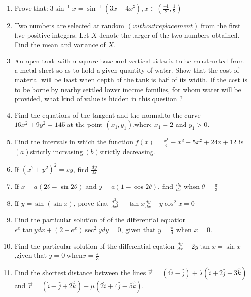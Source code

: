 \documentclass[10pt,-letter paper]{article}
\providecommand{\brak}[1]{\ensuremath{\left(#1\right)}}
\begin{document}
\begin{enumerate}
\item Prove that:
$3\sin^{-1}x=\sin^{-1}\brak{3x-4x^3}, x\in\brak{\frac{-1}{2},\frac{1}{2}}$

\item Two numbers are selected at random \brak{without replacement} from the first five positive integers. Let $X$ denote the larger of the two numbers obtained. Find the mean and variance of $X$.

\item An open tank with a square base and vertical sides is to be constructed from a metal sheet so as to hold a given quantity of water. Show that the cost of material will be least when depth of the tank is half of its width. If the cost is to be borne by nearby settled lower income families, for whom water will be provided, what kind of value is hidden in this question ?

\item Find the equations of the tangent and the normal,to the curve $16x^{2}+9y^{2}=145$ at the point $\brak{x_1,y_1}$,where $x_1=2$ and $y_1>0$.

\item Find the intervals in which the function $f\brak{x}=\frac{x^4}{4}-x^{3}-5x^{2}+24x+12 $ is $(a)$strictly increasing,$(b)$strictly decreasing.

\item If ${\brak{x^{2}+y^{2}}}^{2}=xy$, find $\frac{dy}{dx}$

\item If $x=a\brak{2\theta-\sin 2\theta}$ and $y=a\brak{1-\cos 2\theta}$, find $\frac{dy}{dx}$ when $\theta=\frac{\pi}{3}$

\item If $y=\sin\brak{\sin x}$, prove that $\frac{d^{2}y}{dx^{2}}+\tan x \frac{dy}{dx}+y\cos^{2}x=0$
	
\item Find the particular solution of of the differential equation $e^{x}\tan y dx +\brak{2-e^{x}}\sec^{2}y dy=0$, given that $y=\frac{\pi}{4}$ when $x=0$.

\item Find the particular solution of the differential eqation $\frac{dy}{dx}+2y\tan x =\sin x$,given that $y=0$ when$x=\frac{\pi}{3}$.

\item Find the shortest distance between the lines $\overrightarrow{r}=\brak{4\hat{i}-\hat{j}}+\lambda\brak{\hat{i}+2\hat{j}-3\hat{k}}$ and $\overrightarrow{r}=\brak{\hat{i}-\hat{j}+2\hat{k}}+\mu\brak{2\hat{i}+4\hat{j}-5\hat{k}}$.


\end{enumerate}
\end{document}
